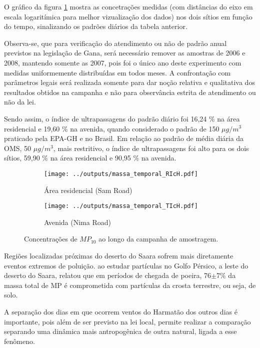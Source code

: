 O gráfico da figura \ref{fig:massa_temporal_mp10} mostra as concetrações medidas
(com distâncias do eixo em escala logaritímica para melhor vizualização dos 
dados) nos dois sítios em função do tempo, sinalizando os padrões diários 
da tabela anterior. 

Observa-se, que para verificação do atendimento ou não de padrão anual previstos
na legislação de Gana, será necessário remover as amostras de 2006 e 2008, 
mantendo somente as 2007, pois foi o único ano deste experimento com medidas 
uniformemente distribuídas em todos meses. A confrontação com parâmetros legais 
será realizada somente para dar noção relativa e qualitativa dos resultados 
obtidos na campanha e não para observância estrita de atendimento ou não da lei.

Sendo assim, o índice de ultrapassagens do padrão diário foi 16,24 \% na área 
residencial e 19,60 \% na avenida, quando considerado o padrão de 150 
$\mu g / m^3$ praticado pela EPA-GH e no Brasil. Em relação
ao padrão de média diária da OMS, 50 $\mu g / m^3$, mais restritivo, 
o índice de ultrapassagens foi alto para os dois sítios, 59,90 \% 
na área residencial e 90,95 \% na avenida.

\begin{figure}[H]
  \centering
  \begin{subfigure}[b]{0.45\textwidth}
    \texttt{[image: ../outputs/massa\_temporal\_RIcH.pdf]}
    \caption{Área residencial (Sam Road)}
  \end{subfigure}%
  \begin{subfigure}[b]{0.45\textwidth}
    \texttt{[image: ../outputs/massa\_temporal\_TIcH.pdf]}
    \caption{Avenida (Nima Road)}
  \end{subfigure}
  \caption{Concentrações de $MP_{10}$ ao longo da campanha de amostragem.
           \label{fig:massa_temporal_mp10}}
\end{figure}

Regiões localizadas próximas do deserto do Saara sofrem mais diretamente 
eventos extremos de poluição. \citet{kaku2016} ao estudar partículas no 
Golfo Pérsico, a leste do deserto do Saara, relatou que em períodos de chegada 
de poeira, 76$\pm$7\% da massa total de MP é comprometida com partículas da 
crosta terrestre, ou seja, de solo.

A separação dos dias em que ocorrem ventos do Harmatão dos outros dias é 
importante, pois além de ser previsto na lei local, permite realizar a 
comparação separando uma dinâmica mais antropogênica de outra natural, 
ligada a esse fenômeno.

